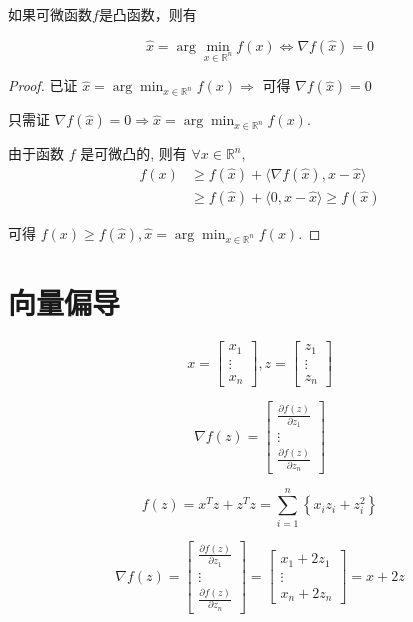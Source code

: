 \begin{theorem}
    如果可微函数$f$是凸函数，则有

    $$ \hat{x}=\arg \min _{x \in \mathbb{R}^{n}} f(x) \Leftrightarrow \nabla f(\hat{x})=0 $$
\end{theorem}

\begin{proof}
    已证 $ \hat{x}=\arg \min _{x \in \mathbb{R}^{n}} f(x) \Rightarrow $ 可得 $ \nabla f(\hat{x})=0 $

    只需证 $ \nabla f(\hat{x})=0 \Rightarrow \hat{x}=\arg \min _{x \in \mathbb{R}^{n}} f(x) $.

    由于函数 $ f $ 是可微凸的, 则有 $ \forall x \in \mathbb{R}^{n} $,
$$
\begin{aligned}
f(x) & \geq f(\hat{x})+\langle\nabla f(\hat{x}), x-\hat{x}\rangle \\
& \geq f(\hat{x})+\langle 0, x-\hat{x}\rangle \geq f(\hat{x})
\end{aligned}
$$

可得 $ f(x) \geq f(\hat{x}), \hat{x}=\arg \min _{x \in \mathbb{R}^{n}} f(x) $.
\end{proof}

\section{向量偏导}

\begin{definition}[向量对向量的导数]
    \label{Definition:VectorVectorDerivative}
    $$ x=\left[\begin{array}{c}x_{1} \\ \vdots \\ x_{n}\end{array}\right], z=\left[\begin{array}{c}z_{1} \\ \vdots \\ z_{n}\end{array}\right] $$

    $$ \nabla f(z)=\left[\begin{array}{c}\frac{\partial f(z)}{\partial z_{1}} \\ \vdots \\ \frac{\partial f(z)}{\partial z_{n}}\end{array}\right] $$
\end{definition}

\begin{example}
    $$ f(z)=x^{T} z+z^{T} z=\sum_{i=1}^{n}\left\{x_{i} z_{i}+z_{i}^{2}\right\} $$

    $$ \nabla f(z)=\left[\begin{array}{c}\frac{\partial f(z)}{\partial z_{1}} \\ \vdots \\ \frac{\partial f(z)}{\partial z_{n}}\end{array}\right]=\left[\begin{array}{c}x_{1}+2 z_{1} \\ \vdots \\ x_{n}+2 z_{n}\end{array}\right]=x+2 z $$
\end{example}


